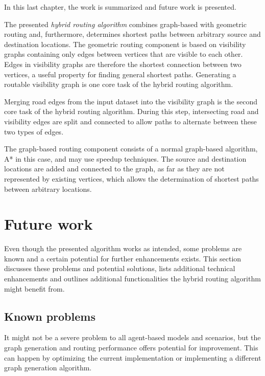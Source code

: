 
In this last chapter, the work is summarized and future work is presented.

The presented \emph{hybrid routing algorithm} combines graph-based with geometric routing and, furthermore, determines shortest paths between arbitrary source and destination locations.
The geometric routing component is based on visibility graphs containing only edges between vertices that are visible to each other.
Edges in visibility graphs are therefore the shortest connection between two vertices, a useful property for finding general shortest paths.
Generating a routable visibility graph is one core task of the hybrid routing algorithm.

Merging road edges from the input dataset into the visibility graph is the second core task of the hybrid routing algorithm.
During this step, intersecting road and visibility edges are split and connected to allow paths to alternate between these two types of edges.

The graph-based routing component consists of a normal graph-based algorithm, A* in this case, and may use speedup techniques.
The source and destination locations are added and connected to the graph, as far as they are not represented by existing vertices, which allows the determination of shortest paths between arbitrary locations.
	
\section{Future work}
\label{sec:future-work}

	Even though the presented algorithm works as intended, some problems are known and a certain potential for further enhancements exists.
	This section discusses these problems and potential solutions, lists additional technical enhancements and outlines additional functionalities the hybrid routing algorithm might benefit from.

	\subsection{Known problems}
		It might not be a severe problem to all agent-based models and scenarios, but the graph generation and routing performance offers potential for improvement.
		This can happen by optimizing the current implementation or implementing a different graph generation algorithm.
		
